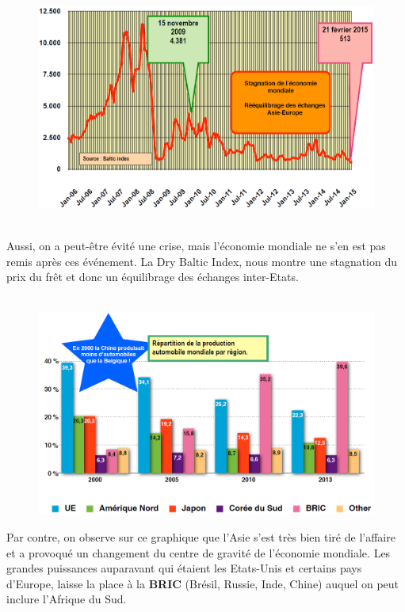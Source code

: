 \begin{figure}
	\includegraphics[scale=0.26]{25}
\end{figure}
\ \\ Aussi, on a peut-être évité une crise, mais l'économie mondiale ne s'en est pas remis après ces événement. La Dry Baltic Index, nous montre une stagnation du prix du frêt et donc un équilibrage des échanges inter-Etats. \\\\

\begin{figure}
	\includegraphics[scale=0.32]{26}
\end{figure}
\noindent Par contre, on observe sur ce graphique que l'Asie s'est très bien tiré de l'affaire et a provoqué un changement du centre de gravité de l'économie mondiale. Les grandes puissances auparavant qui étaient les Etats-Unis et certains pays d'Europe, laisse la place à la \textbf{BRIC} (Brésil, Russie, Inde, Chine) auquel on peut inclure l'Afrique du Sud.  
